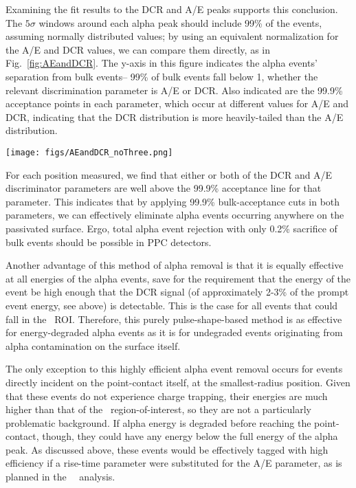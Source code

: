 \documentclass[groupedaddress,rmp,amsmath,amssymb,bibnotes,altaffilletter,twocolumn]{revtex4-1}
\begin{document}
Examining the fit results to the DCR and A/E peaks supports this conclusion. The $5\sigma$ windows around each alpha peak should include 99\% of the events, assuming normally distributed values; by using an equivalent normalization for the A/E and DCR values, we can compare them directly, as in Fig.~\ref{fig:AEandDCR}. The y-axis in this figure indicates the alpha events' separation from bulk events-- 99\% of bulk events fall below 1, whether the relevant discrimination parameter is A/E or DCR. Also indicated are the 99.9\% acceptance points in each parameter, which occur at different values for A/E and DCR, indicating that the DCR distribution is more heavily-tailed than the A/E distribution. 

\begin{figure*}[]
 \centering
 \texttt{[image: figs/AEandDCR\_noThree.png]}
 \caption{The $5\sigma$ window containing the A/E and DCR alpha peak positions at each position, normalized to 99\% bulk acceptance of both cuts. The red points and magenta boxes indicate the centroids and $\pm 2.5\sigma$ values of the peaks in {\tt dcrpzc99norm}, and the green points and blue boxes indicate the same in {\tt aenorm}. The red dotted line and cyan dotted-dashed line are the 99.9\% acceptance points in DCR and A/E, respectively. The black dashed line indicates the 99\% acceptance point in both parameters.} 
 \label{fig:AEandDCR}
\end{figure*}

For each position measured, we find that either or both of the DCR and A/E discriminator parameters are well above the 99.9\% acceptance line for that parameter. This indicates that by applying 99.9\% bulk-acceptance cuts in both parameters, we can effectively eliminate alpha events occurring anywhere on the passivated surface. Ergo, total alpha event rejection with only 0.2\% sacrifice of bulk events should be possible in PPC detectors.

Another advantage of this method of alpha removal is that it is equally effective at all energies of the alpha events, save for the requirement that the energy of the event be high enough that the DCR signal (of approximately 2-3\% of the prompt event energy, see above) is detectable. This is the case for all events that could fall in the \nonubb\ ROI. Therefore, this purely pulse-shape-based method is as effective for energy-degraded alpha events as it is for undegraded events originating from alpha contamination on the surface itself.

The only exception to this highly efficient alpha event removal occurs for events directly incident on the point-contact itself, at the smallest-radius position. Given that these events do not experience charge trapping, their energies are much higher than that of the \nonubb\ region-of-interest, so they are not a particularly problematic background. If alpha energy is degraded before reaching the point-contact, though, they could have any energy below the full energy of the alpha peak. As discussed above, these events would be effectively tagged with high efficiency if a rise-time parameter were substituted for the A/E parameter, as is planned in the \MJ\ \DEM\ analysis. 
\end{document}

